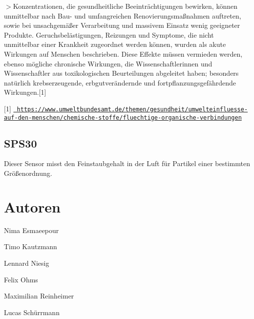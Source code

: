 $>$Konzentrationen, die gesundheitliche Beeinträchtigungen bewirken, können unmittelbar nach Bau-\/ und umfangreichen Renovierungsmaßnahmen auftreten, sowie bei unsachgemäßer Verarbeitung und massivem Einsatz wenig geeigneter Produkte. Geruchsbelästigungen, Reizungen und Symptome, die nicht unmittelbar einer Krankheit zugeordnet werden können, wurden als akute Wirkungen auf Menschen beschrieben. Diese Effekte müssen vermieden werden, ebenso mögliche chronische Wirkungen, die Wissenschaftlerinnen und Wissenschaftler aus toxikologischen Beurteilungen abgeleitet haben; besonders natürlich krebserzeugende, erbgutverändernde und fortpflanzungsgefährdende Wirkungen.\mbox{[}1\mbox{]}

\mbox{[}1\mbox{]} \href{https://www.umweltbundesamt.de/themen/gesundheit/umwelteinfluesse-auf-den-menschen/chemische-stoffe/fluechtige-organische-verbindungen}{\texttt{ https\+://www.\+umweltbundesamt.\+de/themen/gesundheit/umwelteinfluesse-\/auf-\/den-\/menschen/chemische-\/stoffe/fluechtige-\/organische-\/verbindungen}}\hypertarget{autotoc_md0_autotoc_md8}{}\subsection{S\+P\+S30}\label{autotoc_md0_autotoc_md8}
Dieser Sensor misst den Feinstaubgehalt in der Luft für Partikel einer bestimmten Größenordnung.


\begin{DoxyCode}{0}
\DoxyCodeLine{\};}
\end{DoxyCode}
\hypertarget{autotoc_md0_autotoc_md9}{}\section{Autoren}\label{autotoc_md0_autotoc_md9}
Nima Esmaeepour

Timo Kautzmann

Lennard Niesig

Felix Ohms

Maximilian Reinheimer

Lucas Schürrmann 
